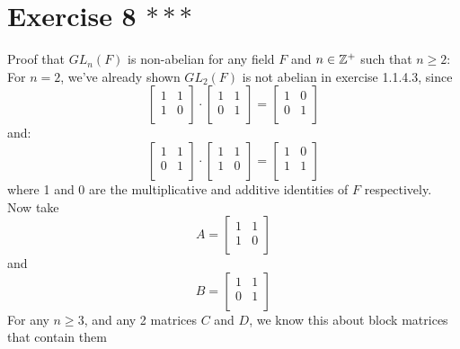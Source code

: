\documentclass[12pt]{article}
\begin{document}
    \section*{Exercise 8 $***$}
    Proof that $GL_n(F)$ is non-abelian for any field $F$
    and $n \in \mathbb{Z}^+$ such that $n \geqslant 2$: \\
    For $n = 2$, we've already shown $GL_2(F)$ is not abelian in exercise
    1.1.4.3, since  
    \[ \begin{bmatrix}
        1 & 1 \\
        1 & 0 \\
    \end{bmatrix} \cdot
    \begin{bmatrix}
        1 & 1 \\
        0 & 1 \\
    \end{bmatrix}
    = \begin{bmatrix}
        1 & 0 \\
        0 & 1 \\
    \end{bmatrix} \]
    and: 
    \[ \begin{bmatrix}
        1 & 1 \\
        0 & 1 \\
    \end{bmatrix} \cdot
    \begin{bmatrix}
        1 & 1 \\
        1 & 0 \\
    \end{bmatrix}
    = \begin{bmatrix}
        1 & 0 \\
        1 & 1 \\
    \end{bmatrix} \]
    where 1 and 0 are the multiplicative and additive identities of
    $F$ respectively. \\
    Now take 
    \[ A = \begin{bmatrix}
        1 & 1 \\
        1 & 0 \\
    \end{bmatrix}\]
    and
    \[ B = \begin{bmatrix}
        1 & 1 \\
        0 & 1 \\
    \end{bmatrix} \]
    For any $n \geqslant 3$,
    and any 2 matrices $C$ and $D$,
    we know this about block matrices that contain them
\end{document}
